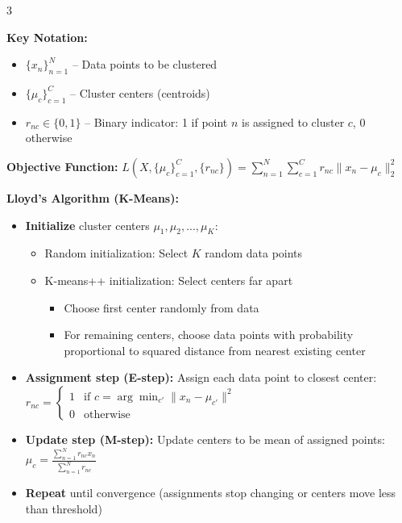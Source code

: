 \documentclass[10pt,landscape]{article}
\begin{document}
\begin{multicols}{3}
\begin{tcolorbox}[breakable, title=K-Means Clustering, colback=kmeans, boxsep=1pt, left=1pt, right=1pt, top=1pt, bottom=1pt]
\textbf{Key Notation:}
\begin{itemize}[leftmargin=*,noitemsep,topsep=0pt]
    \item $\{x_n\}_{n=1}^N$ -- Data points to be clustered
    \item $\{\mu_c\}_{c=1}^C$ -- Cluster centers (centroids)
    \item $r_{nc} \in \{0,1\}$ -- Binary indicator: 1 if point $n$ is assigned to cluster $c$, 0 otherwise
\end{itemize}

\textbf{Objective Function:}
$L(X, \{\mu_c\}_{c=1}^C, \{r_{nc}\}) = \sum_{n=1}^N \sum_{c=1}^C r_{nc}\|x_n - \mu_c\|^2_2$

\textbf{Lloyd's Algorithm (K-Means):}
\begin{itemize}[leftmargin=*,noitemsep,topsep=0pt]
    \item \textbf{Initialize} cluster centers $\mu_1, \mu_2, ..., \mu_K$:
    \begin{itemize}[noitemsep]
        \item Random initialization: Select $K$ random data points
        \item K-means++ initialization: Select centers far apart
        \begin{itemize}[noitemsep]
            \item Choose first center randomly from data
            \item For remaining centers, choose data points with probability proportional to squared distance from nearest existing center
        \end{itemize}
    \end{itemize}
    
    \item \textbf{Assignment step (E-step):} Assign each data point to closest center:
    $r_{nc} = 
    \begin{cases} 
    1 & \text{if } c = \arg\min_{c'} \|x_n - \mu_{c'}\|^2 \\
    0 & \text{otherwise}
    \end{cases}$
    
    \item \textbf{Update step (M-step):} Update centers to be mean of assigned points:
    $\mu_c = \frac{\sum_{n=1}^N r_{nc}x_n}{\sum_{n=1}^N r_{nc}}$
    
    \item \textbf{Repeat} until convergence (assignments stop changing or centers move less than threshold)
\end{itemize}


\end{tcolorbox}
\end{multicols}
\end{document}
